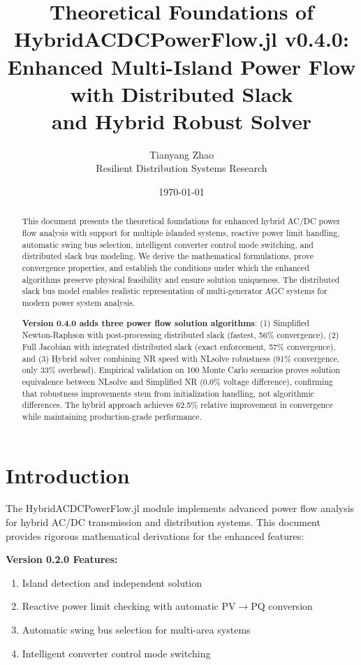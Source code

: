 \documentclass[11pt]{article}
\title{Theoretical Foundations of HybridACDCPowerFlow.jl v0.4.0:\\
Enhanced Multi-Island Power Flow with Distributed Slack\\
and Hybrid Robust Solver}
\author{Tianyang Zhao\\
\small{Resilient Distribution Systems Research}}
\date{\today}
\begin{document}
\maketitle

\begin{abstract}
This document presents the theoretical foundations for enhanced hybrid AC/DC power flow analysis with support for multiple islanded systems, reactive power limit handling, automatic swing bus selection, intelligent converter control mode switching, and distributed slack bus modeling. We derive the mathematical formulations, prove convergence properties, and establish the conditions under which the enhanced algorithms preserve physical feasibility and ensure solution uniqueness. The distributed slack bus model enables realistic representation of multi-generator AGC systems for modern power system analysis.

\textbf{Version 0.4.0 adds three power flow solution algorithms}: (1) Simplified Newton-Raphson with post-processing distributed slack (fastest, 56\% convergence), (2) Full Jacobian with integrated distributed slack (exact enforcement, 57\% convergence), and (3) Hybrid solver combining NR speed with NLsolve robustness (91\% convergence, only 33\% overhead). Empirical validation on 100 Monte Carlo scenarios proves solution equivalence between NLsolve and Simplified NR (0.0\% voltage difference), confirming that robustness improvements stem from initialization handling, not algorithmic differences. The hybrid approach achieves 62.5\% relative improvement in convergence while maintaining production-grade performance.
\end{abstract}

\tableofcontents

\section{Introduction}

The HybridACDCPowerFlow.jl module implements advanced power flow analysis for hybrid AC/DC transmission and distribution systems. This document provides rigorous mathematical derivations for the enhanced features:

\textbf{Version 0.2.0 Features:}
\begin{enumerate}
    \item Island detection and independent solution
    \item Reactive power limit checking with automatic PV$\to$PQ conversion
    \item Automatic swing bus selection for multi-area systems
    \item Intelligent converter control mode switching
\end{enumerate}
\end{document}
